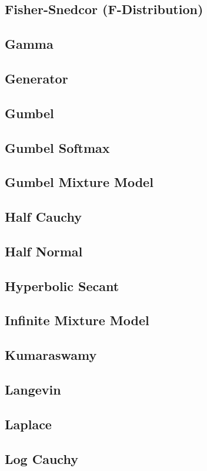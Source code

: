 \subsection{Fisher-Snedcor (F-Distribution)}
\subsection{Gamma}
\subsection{Generator}
\subsection{Gumbel}
\subsection{Gumbel Softmax}
\subsection{Gumbel Mixture Model}
\subsection{Half Cauchy}
\subsection{Half Normal}
\subsection{Hyperbolic Secant}
\subsection{Infinite Mixture Model}
\subsection{Kumaraswamy}
\subsection{Langevin}
\subsection{Laplace}
\subsection{Log Cauchy}
